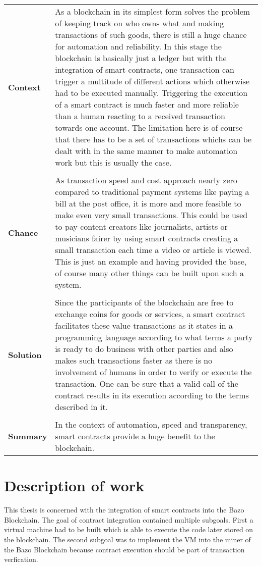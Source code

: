 \begin{tabular}[t]{ p{3cm} p{12.5cm}}
\textbf{Context} &
As a blockchain in its simplest form solves the problem of keeping track on who owns what and making transactions of such goods, there is still a huge chance for automation and reliability. In this stage the blockchain is basically just a ledger but with the integration of smart contracts, one transaction can trigger a multitude of different actions which otherwise had to be executed manually. Triggering the execution of a smart contract is much faster and more reliable than a human reacting to a received transaction towards one account. The limitation here is of course that there has to be a set of transactions whichs can be dealt with in the same manner to make automation work but this is usually the case. \\ \\

\textbf{Chance} &
As transaction speed and cost approach nearly zero compared to traditional payment systems like paying a bill at the post office, it is more and more feasible to make even very small transactions. This could be used to pay content creators like journalists, artists or musicians fairer by using smart contracts creating a small transaction each time a video or article is viewed. This is just an example and having provided the base, of course many other things can be built upon such a system.\\ \\

\textbf{Solution} &
Since the participants of the blockchain are free to exchange coins for goods or services, a smart contract facilitates these value transactions as it states in a programming language according to what terms a party is ready to do business with other parties and also makes such transactions faster as there is no involvement of humans in order to verify or execute the transaction. One can be sure that a valid call of the contract results in its execution according to the terms described in it. \\ \\

\textbf{Summary} &
In the context of automation, speed and transparency, smart contracts provide a huge benefit to the blockchain.

\end{tabular}

\section{Description of work}
\label{descriptionofwork}
This thesis is concerned with the integration of smart contracts into the Bazo Blockchain. The goal of contract integration contained multiple subgoals. First a virtual machine had to be built which is able to execute the code later stored on the blockchain. The second subgoal was to implement the VM into the miner of the Bazo Blockchain because contract execution should be part of transaction verfication.
